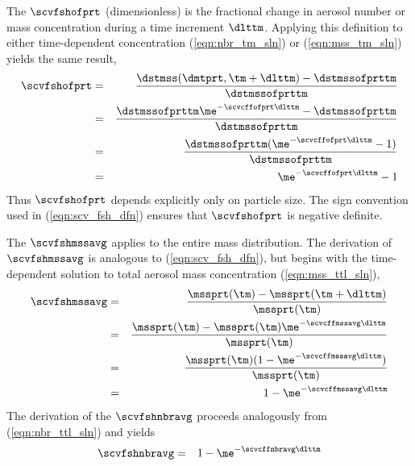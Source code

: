 \documentclass[12pt,twoside]{book}
\begin{document}
The  $\scvfshofprt$
(dimensionless) is the fractional change in aerosol number or mass
concentration  during a time increment $\dlttm$.
Applying this definition to either time-dependent concentration
(\ref{eqn:nbr_tm_sln}) or (\ref{eqn:mss_tm_sln}) yields the same
result, 
\begin{eqnarray}
\scvfshofprt & = & 
\frac{\dstmss ( \dmtprt, \tm + \dlttm ) - \dstmssofprttm
}{ \dstmssofprttm } \nonumber \\
& = & 
\frac{\dstmssofprttm \me^{- \scvcffofprt \dlttm } - \dstmssofprttm
}{ \dstmssofprttm } \nonumber \\
& = & 
\frac{\dstmssofprttm ( \me^{- \scvcffofprt \dlttm } - 1 )
}{ \dstmssofprttm } \nonumber \\
& = & \me^{- \scvcffofprt \dlttm } - 1
\label{eqn:scv_fsh_dfn}
\end{eqnarray}
Thus $\scvfshofprt$ depends explicitly only on particle size.
The sign convention used in (\ref{eqn:scv_fsh_dfn}) ensures that
$\scvfshofprt$ is negative definite. 

The  $\scvfshmssavg$
applies to the entire mass distribution. 
The derivation of $\scvfshmssavg$ is analogous to
(\ref{eqn:scv_fsh_dfn}), but begins with the time-dependent 
solution to total aerosol mass concentration (\ref{eqn:mss_ttl_sln}), 
\begin{eqnarray}
\scvfshmssavg & = & 
\frac{\mssprt ( \tm ) - \mssprt ( \tm + \dlttm )}{\mssprt ( \tm ) }
\nonumber \\
& = & 
\frac{\mssprt( \tm ) - \mssprt( \tm ) \me^{- \scvcffmssavg \dlttm } 
}{ \mssprt ( \tm ) } \nonumber \\
& = & 
\frac{\mssprt( \tm ) ( 1 - \me^{- \scvcffmssavg \dlttm } )
}{ \mssprt ( \tm ) } \nonumber \\
& = & 1 - \me^{- \scvcffmssavg \dlttm }
\label{eqn:scv_fsh_mss_avg_dfn}
\end{eqnarray}
The derivation of the 
$\scvfshnbravg$ proceeds analogously from (\ref{eqn:nbr_ttl_sln}) and
yields 
\begin{eqnarray}
\scvfshnbravg & = & 1 - \me^{- \scvcffnbravg \dlttm }
\label{eqn:scv_fsh_nbr_avg_dfn}
\end{eqnarray}
\end{document}
